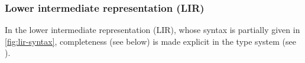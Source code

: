 \documentclass[index.tex]{subfiles}
\begin{document}
\newcommand{\ETrue}{\ensuremath{\SyTrue}}
\newcommand{\EAnd}[2]{\ensuremath{#1 \SyAnd #2}}
\newcommand{\EOr}[2]{\ensuremath{#1 \SyOr #2}}

\newcommand{\EPair}[2]{\ensuremath{(#1, #2)}}
\newcommand{\EProjL}[1]{\ensuremath{\SyProjL~ #1}}
\newcommand{\EProjR}[1]{\ensuremath{\SyProjR~ #1}}

\newcommand{\EEHole}[2]{\ensuremath{\SyEHole{#1}{#2}}}

\newcommand{\EVarNamed}[2]{\ensuremath{t_{#1}^{{\color{gray}#2}}}}

\subsubsection{Lower intermediate representation (LIR)}
\label{sec:lir}

In the lower intermediate representation (LIR), whose syntax is partially given in
\cref{fig:lir-syntax}, completeness (see below) is made explicit in the type system
(see ).
\end{document}
